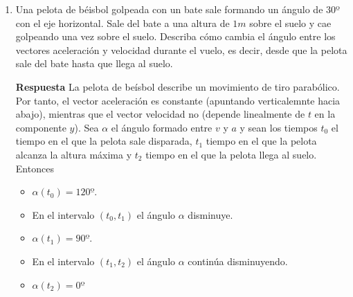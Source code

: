 \documentclass{article}
\begin{document}
\begin{enumerate}
	\textbf{Respuesta} Cero

	\item Una pelota de béisbol golpeada con un bate sale formando un ángulo de 30º con el eje horizontal. Sale del bate a una altura de $1m$ sobre el suelo y cae golpeando una vez sobre el suelo. Describa cómo cambia el ángulo entre los vectores aceleración y velocidad durante el vuelo, es decir, desde que la pelota sale del bate hasta que llega al suelo.

	\textbf{Respuesta} La pelota de beísbol describe un movimiento de tiro parabólico. Por tanto, el vector aceleración es constante (apuntando verticalemnte hacia abajo), mientras que el vector velocidad no (depende linealmente de $t$ en la componente $y$). Sea $\alpha$ el ángulo formado entre $v$ y $a$ y sean los tiempos $t_0$ el tiempo en el que la pelota sale disparada, $t_1$ tiempo en el que la pelota alcanza la altura máxima y $t_2$ tiempo en el que la pelota llega al suelo. Entonces
	
	\begin{itemize}
		\item $\alpha(t_0)=120º$.
		\item En el intervalo $(t_0,t_1)$  el ángulo $\alpha$ disminuye.
		\item $\alpha(t_1)=90º$.
		\item En el intervalo $(t_1,t_2)$  el ángulo $\alpha$ continúa disminuyendo.
		\item $\alpha(t_2)=0º$
	\end{itemize}


	

	
	
	
	
	
	
\end{enumerate}

    
\end{document}
